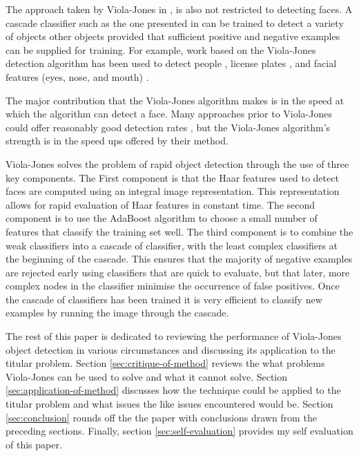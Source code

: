 \documentclass[conference]{IEEEtran}
\begin{document}
The approach taken by Viola-Jones in \cite{viola2004robust}, is also not restricted to detecting faces. A cascade classifier such as the one presented in \cite{viola2004robust} can be trained to detect a variety of objects other objects provided that sufficient positive and negative examples can be supplied for training. For example, work based on the Viola-Jones detection algorithm has been used to detect people \cite{viola2003detecting}, license plates \cite{zhang2006learning}, and facial features (eyes, nose, and mouth) \cite{wilson2006facial}.

The major contribution that the Viola-Jones algorithm makes is in the speed at which the algorithm can detect a face. Many approaches prior to Viola-Jones could offer reasonably good detection rates \cite{sung1998example} \cite{schneiderman2000statistical} \cite{rowley1998neural}, but the Viola-Jones algorithm's strength is in the speed ups offered by their method.

Viola-Jones solves the problem of rapid object detection through the use of three key components. The First component is that the Haar features used to detect faces are computed using an integral image representation. This representation allows for rapid evaluation of Haar features in constant time. The second component is to use the AdaBoost algorithm to choose a small number of features that classify the training set well. The third component is to combine the weak classifiers into a cascade of classifier, with the least complex classifiers at the beginning of the cascade. This ensures that the majority of negative examples are rejected early using classifiers that are quick to evaluate, but that later, more complex nodes in the classifier minimise the occurrence of false positives. Once the cascade of classifiers has been trained it is very efficient to classify new examples by running the image through the cascade.

The rest of this paper is dedicated to reviewing the performance of Viola-Jones object detection in various circumstances and discussing its application to the titular problem. Section \ref{sec:critique-of-method} reviews the what problems Viola-Jones can be used to solve and what it cannot solve. Section \ref{sec:application-of-method} discusses how the technique could be applied to the titular problem and what issues the like issues encountered would be. Section \ref{sec:conclusion} rounds off the the paper with conclusions drawn from the preceding sections. Finally, section \ref{sec:self-evaluation} provides my self evaluation of this paper.
\end{document}

